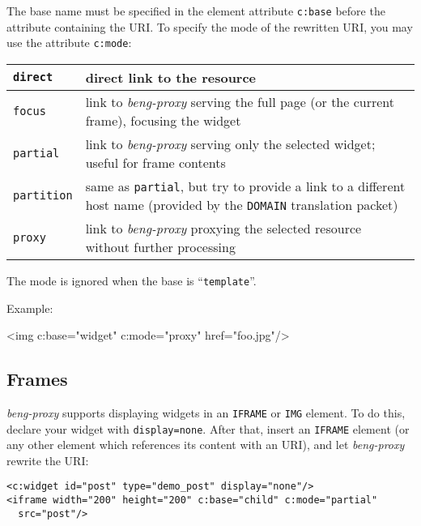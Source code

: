 \documentclass[a4paper,12pt]{article}
\begin{document}
The base name must be specified in the element attribute
\texttt{c:base} before the attribute containing the URI.  To specify
the mode of the rewritten URI, you may use the attribute
\texttt{c:mode}:

\begin{tabular}{|l|p{10cm}|}
\hline

\texttt{direct} & direct link to the resource \\

\hline

\texttt{focus} & link to \emph{beng-proxy} serving the full page (or
the current frame), focusing the widget \\

\hline

\texttt{partial} & link to \emph{beng-proxy} serving only the selected
widget; useful for frame contents \\

\hline

\texttt{partition} & same as \texttt{partial}, but try to provide a
link to a different host name (provided by the \texttt{DOMAIN}
translation packet) \\

\hline

\texttt{proxy} & link to \emph{beng-proxy} proxying the selected
resource without further processing \\

\hline
\end{tabular}

The mode is ignored when the base is ``\texttt{template}''.

Example:

\begin{verbatim*}
<img c:base="widget" c:mode="proxy" href="foo.jpg"/>
\end{verbatim*}

\subsection{Frames}
\label{frames}

\emph{beng-proxy} supports displaying widgets in an \texttt{IFRAME} or
\texttt{IMG} element.  To do this, declare your widget with
\texttt{display=none}.  After that, insert an \texttt{IFRAME} element
(or any other element which references its content with an URI), and
let \emph{beng-proxy} rewrite the URI:

\begin{verbatim}
<c:widget id="post" type="demo_post" display="none"/>
<iframe width="200" height="200" c:base="child" c:mode="partial"
  src="post"/>
\end{verbatim}
\end{document}
